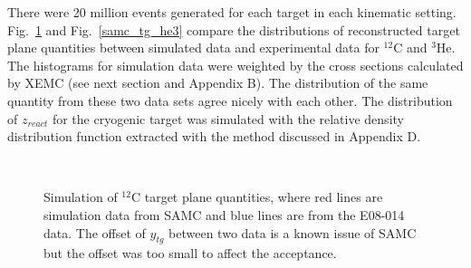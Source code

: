  There were 20 million events generated for each target in each kinematic setting. Fig.~\ref{samc_tg_c12} and Fig.~\ref{samc_tg_he3} compare the distributions of reconstructed target plane quantities between simulated data and experimental data for $\mathrm{^{12}C}$ and $\mathrm{^{3}He}$. The histograms for simulation data were weighted by the cross sections calculated by XEMC (see next section and Appendix B). The distribution of the same quantity from these two data sets agree nicely with each other. The distribution of $z_{react}$ for the cryogenic target was simulated with the relative density distribution function extracted with the method discussed in Appendix D.
\begin{figure}[!ht]
  \begin{center}
    \\
    \caption[Simulation of $\mathrm{^{12}C}$ target plane quantities]{\footnotesize{Simulation of $\mathrm{^{12}C}$ target plane quantities, where red lines are simulation data from SAMC and blue lines are from the E08-014 data. The offset of $y_{tg}$ between two data is a known issue of SAMC but the offset was too small to affect the acceptance.}}
    \label{samc_tg_c12}
  \end{center}
\end{figure}
